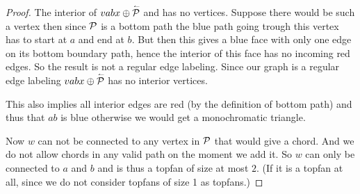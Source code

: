 \begin{proof}
      The interior of  $vabx \oplus \rev \P$ and has no vertices. Suppose there would be such a vertex then since $\P$ is a bottom path the blue path going trough this vertex has to start at $a$ and end at $b$. But then this gives a blue face with only one edge on its bottom boundary path, hence the interior of this face has no incoming red edges.  So the result is not a regular edge labeling. Since our graph is a regular edge labeling $vabx \oplus \rev \P$ has no interior vertices.

      This also implies all interior edges are red (by the definition of bottom path) and thus that $ab$ is blue otherwise we would get a monochromatic triangle.

      Now $w$ can not be connected to any vertex in $\P$ that would give a chord. And we do not allow chords in any valid path on the moment we add it. So $w$ can only be connected to $a$ and $b$ and is thus a topfan of size at most $2$. (If it is a topfan at all, since we do not consider topfans of size 1 as topfans.)
    \end{proof}
